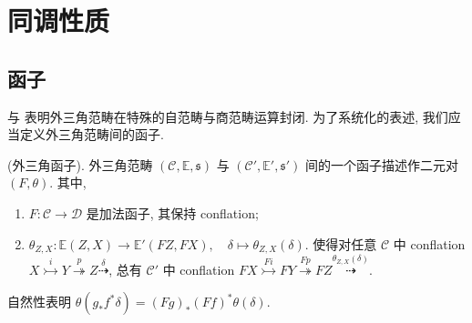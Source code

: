 \section{同调性质}

\subsection{函子}

 与 表明外三角范畴在特殊的自范畴与商范畴运算封闭. 为了系统化的表述, 我们应当定义外三角范畴间的函子. 

\begin{definition}\label{def:extri-functor}
    (外三角函子). 外三角范畴 $(\mathcal{C}, \mathbb E, \mathfrak s)$ 与 $(\mathcal{C}', \mathbb E', \mathfrak s')$ 间的一个函子描述作二元对 $(F, \theta)$. 其中,
    \begin{enumerate}
        \item $F: \mathcal{C} \to \mathcal{D}$ 是加法函子, 其保持 conflation;
        \item $\theta_{Z,X} : \mathbb E(Z, X) \to \mathbb E' (FZ, FX),\quad \delta \mapsto \theta_{Z,X}(\delta)$. 使得对任意 $\mathcal{C}$ 中 conflation $X \overset {i} \rightarrowtail Y \overset {p} \twoheadrightarrow Z \overset \delta \dashrightarrow$, 总有 $\mathcal{C}'$ 中 conflation $FX \overset {Fi} \rightarrowtail FY \overset {Fp} \twoheadrightarrow FZ \overset {\theta_{Z,X}(\delta)} \dashrightarrow$.
    \end{enumerate}
    
\end{definition}

\begin{remark}
    自然性表明 $\theta(g_\ast f^\ast \delta) = (Fg)_\ast (Ff)^\ast \theta(\delta)$.
\end{remark}

